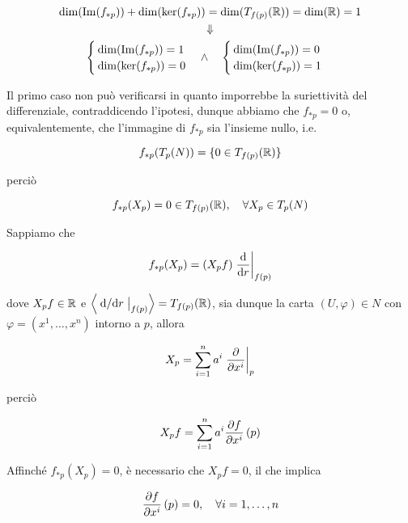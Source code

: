 \begin{gather}
	\dim(\Im(f_{*p})) + \dim(\ker(f_{*p})) = \dim(T_{f(p)}(\R)) = \dim(\R) = 1 \\%
	\Downarrow \nonumber \\%
	\begin{cases}
		\dim(\Im(f_{*p})) = 1 \\
		\dim(\ker(f_{*p})) = 0
	\end{cases} %
	\wedge \quad
	\begin{cases}
		\dim(\Im(f_{*p})) = 0 \\
		\dim(\ker(f_{*p})) = 1
	\end{cases}
\end{gather}

Il primo caso non può verificarsi in quanto imporrebbe la suriettività del differenziale, contraddicendo l'ipotesi, dunque abbiamo che $ f_{*p} = 0 $ o, equivalentemente, che l'immagine di $ f_{*p} $ sia l'insieme nullo, i.e.

\begin{equation}
	f_{*p}(T_{p}(N)) = \{0 \in T_{f(p)}(\mathbb{R})\}
\end{equation}

perciò

\begin{equation}
	f_{*p}(X_{p}) = 0 \in T_{f(p)}(\R) \qcomma \forall X_{p} \in T_{p}(N)
\end{equation}

Sappiamo che

\begin{equation}
	f_{*p}(X_{p}) = (X_{p} f) \eval{ \dv{r} }_{f(p)}
\end{equation}

dove $ X_{p} f \in \mathbb{R} $ e $ \ev{ \eval{ \dv*{r} }_{f(p)} } = T_{f(p)}(\R) $, sia dunque la carta $ (U,\varphi) \in N $ con $ \varphi = (x^{1},\dots,x^{n}) $ intorno a $ p $, allora

\begin{equation}
	X_{p} = \sum_{i=1}^{n} a^{i} \eval{ \pdv{x^{i}} }_{p}
\end{equation}

perciò

\begin{equation}
	X_{p} f = \sum_{i=1}^{n} a^{i} \pdv{f}{x^{i}} \, (p)
\end{equation}

Affinché $ f_{*p}(X_{p}) = 0 $, è necessario che $ X_{p} f = 0 $, il che implica

\begin{equation}
	\pdv{f}{x^{i}} \, (p) = 0 \qcomma \forall i=1,\dots,n
\end{equation}

